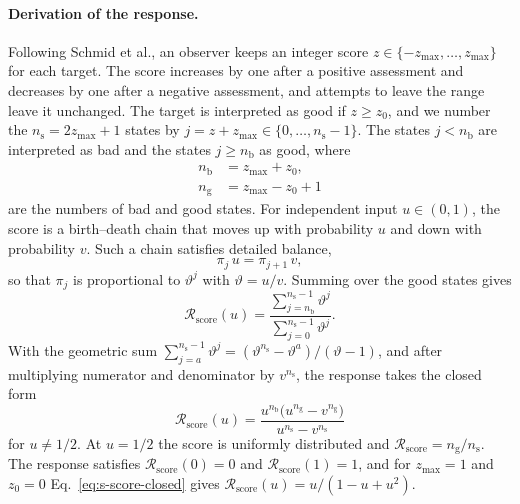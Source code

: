 \documentclass[10pt]{wlscirep}
\newcommand{\Rmap}{\mathscr{R}}            %
\theoremstyle{plain}
\theoremstyle{remark}
\begin{document}
\paragraph{Derivation of the response.} Following Schmid et al., an observer keeps an integer score $z\in\{-z_{\max},\ldots,z_{\max}\}$ for each target. The score increases by one after a positive assessment and decreases by one after a negative assessment, and attempts to leave the range leave it unchanged. The target is interpreted as good if $z\geq z_0$, and we number the $n_{\mathrm s}=2z_{\max}+1$ states by $j=z+z_{\max}\in\{0,\ldots,n_{\mathrm s}-1\}$. The states $j<n_{\mathrm b}$ are interpreted as bad and the states $j\geq n_{\mathrm b}$ as good, where
\begin{equation}
\begin{aligned}
n_{\mathrm b}&=z_{\max}+z_0,\\
n_{\mathrm g}&=z_{\max}-z_0+1
\end{aligned}
\label{eq:s-score-counts}
\end{equation}
are the numbers of bad and good states. For independent input $u\in(0,1)$, the score is a birth--death chain that moves up with probability $u$ and down with probability $v$. Such a chain satisfies detailed balance,
\begin{equation}
\pi_j\,u=\pi_{j+1}\,v,
\label{eq:s-score-balance}
\end{equation}
so that $\pi_j$ is proportional to $\vartheta^j$ with $\vartheta=u/v$. Summing over the good states gives
\begin{equation}
\Rmap_{\mathrm{score}}(u)=\frac{\sum_{j=n_{\mathrm b}}^{n_{\mathrm s}-1}\vartheta^j}{\sum_{j=0}^{n_{\mathrm s}-1}\vartheta^j}.
\label{eq:s-score}
\end{equation}
With the geometric sum $\sum_{j=a}^{n_{\mathrm s}-1}\vartheta^j=(\vartheta^{n_{\mathrm s}}-\vartheta^a)/(\vartheta-1)$, and after multiplying numerator and denominator by $v^{n_{\mathrm s}}$, the response takes the closed form
\begin{equation}
\Rmap_{\mathrm{score}}(u)=\frac{u^{n_{\mathrm b}}\bigl(u^{n_{\mathrm g}}-v^{n_{\mathrm g}}\bigr)}{u^{n_{\mathrm s}}-v^{n_{\mathrm s}}}
\label{eq:s-score-closed}
\end{equation}
for $u\neq1/2$. At $u=1/2$ the score is uniformly distributed and $\Rmap_{\mathrm{score}}=n_{\mathrm g}/n_{\mathrm s}$. The response satisfies $\Rmap_{\mathrm{score}}(0)=0$ and $\Rmap_{\mathrm{score}}(1)=1$, and for $z_{\max}=1$ and $z_0=0$ Eq.~\eqref{eq:s-score-closed} gives $\Rmap_{\mathrm{score}}(u)=u/(1-u+u^2)$.
\end{document}
